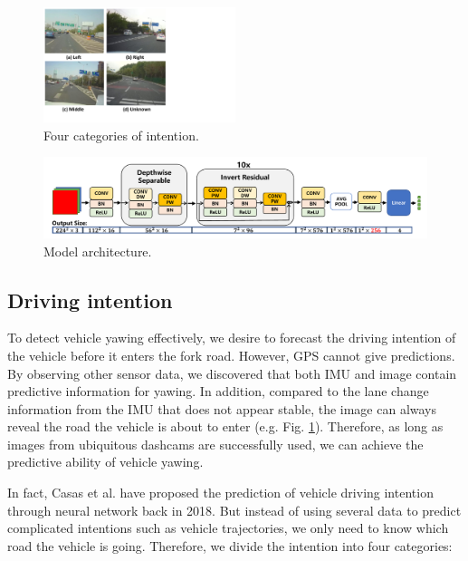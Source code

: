 \documentclass[journal]{IEEEtran}
\begin{document}
\begin{figure}[htbp]
    \centerline{\includegraphics[width=0.5\textwidth]{fig/intention.pdf}}
    \caption{Four categories of intention.}
    \label{fig:intent}
\end{figure}

\begin{figure}[htbp]
    \centerline{\includegraphics[width=1\textwidth]{fig/net.pdf}}
    \caption{Model architecture. }
    \label{fig:net}
\end{figure}
 
\subsection{Driving intention}
To detect vehicle yawing effectively, we desire to forecast the driving intention of the vehicle before it enters the fork road. 
However, GPS cannot give predictions.
By observing other sensor data, we discovered that both IMU and image contain predictive information for yawing.
In addition, compared to the lane change information from the IMU that does not appear stable, the image can always reveal the road the vehicle is about to enter (e.g. Fig. \ref{fig:intent}).
Therefore, as long as images from ubiquitous dashcams are successfully used, we can achieve the predictive ability of vehicle yawing.

In fact, Casas et al. \cite{casas2018intentnet} have proposed the prediction of vehicle driving intention through neural network back in 2018. But instead of using several data to predict complicated intentions such as vehicle trajectories, we only need to know which road the vehicle is going. Therefore, we divide the intention into four categories: 
\end{document}

